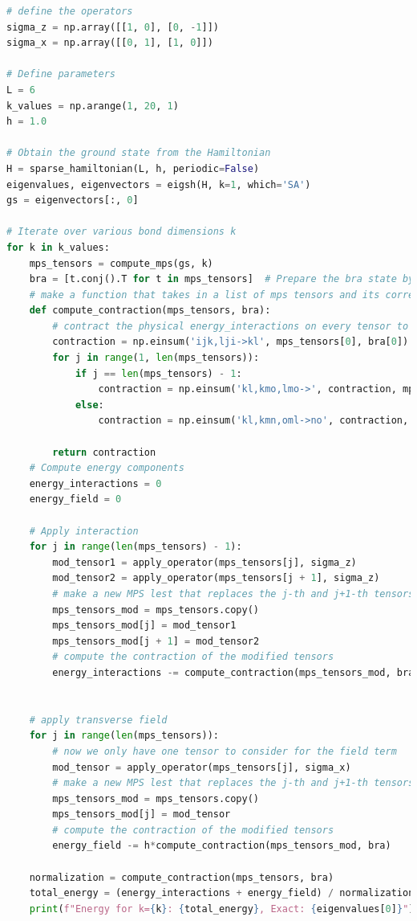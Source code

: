 \documentclass[12pt]{article}
\begin{document}
\begin{lstlisting}[language=Python]
# define the operators
sigma_z = np.array([[1, 0], [0, -1]])
sigma_x = np.array([[0, 1], [1, 0]])

# Define parameters
L = 6
k_values = np.arange(1, 20, 1)
h = 1.0

# Obtain the ground state from the Hamiltonian
H = sparse_hamiltonian(L, h, periodic=False)
eigenvalues, eigenvectors = eigsh(H, k=1, which='SA')
gs = eigenvectors[:, 0]

# Iterate over various bond dimensions k
for k in k_values:
    mps_tensors = compute_mps(gs, k)
    bra = [t.conj().T for t in mps_tensors]  # Prepare the bra state by conjugate transposing every tensor in the lest
    # make a function that takes in a list of mps tensors and its corresponding bra and computes the normalization
    def compute_contraction(mps_tensors, bra):
        # contract the physical energy_interactions on every tensor to generate a list of 2-tensors
        contraction = np.einsum('ijk,lji->kl', mps_tensors[0], bra[0])
        for j in range(1, len(mps_tensors)):
            if j == len(mps_tensors) - 1:
                contraction = np.einsum('kl,kmo,lmo->', contraction, mps_tensors[j], bra[j])
            else:
                contraction = np.einsum('kl,kmn,oml->no', contraction, mps_tensors[j], bra[j])
                
        return contraction
    # Compute energy components
    energy_interactions = 0
    energy_field = 0
    
    # Apply interaction
    for j in range(len(mps_tensors) - 1):
        mod_tensor1 = apply_operator(mps_tensors[j], sigma_z)
        mod_tensor2 = apply_operator(mps_tensors[j + 1], sigma_z)
        # make a new MPS lest that replaces the j-th and j+1-th tensors with the modified ones
        mps_tensors_mod = mps_tensors.copy()
        mps_tensors_mod[j] = mod_tensor1
        mps_tensors_mod[j + 1] = mod_tensor2
        # compute the contraction of the modified tensors
        energy_interactions -= compute_contraction(mps_tensors_mod, bra)

            
    # apply transverse field
    for j in range(len(mps_tensors)):
        # now we only have one tensor to consider for the field term
        mod_tensor = apply_operator(mps_tensors[j], sigma_x)
        # make a new MPS lest that replaces the j-th and j+1-th tensors with the modified ones
        mps_tensors_mod = mps_tensors.copy()
        mps_tensors_mod[j] = mod_tensor
        # compute the contraction of the modified tensors
        energy_field -= h*compute_contraction(mps_tensors_mod, bra)
        
    normalization = compute_contraction(mps_tensors, bra)
    total_energy = (energy_interactions + energy_field) / normalization
    print(f"Energy for k={k}: {total_energy}, Exact: {eigenvalues[0]}")
\end{lstlisting}
\end{document}
